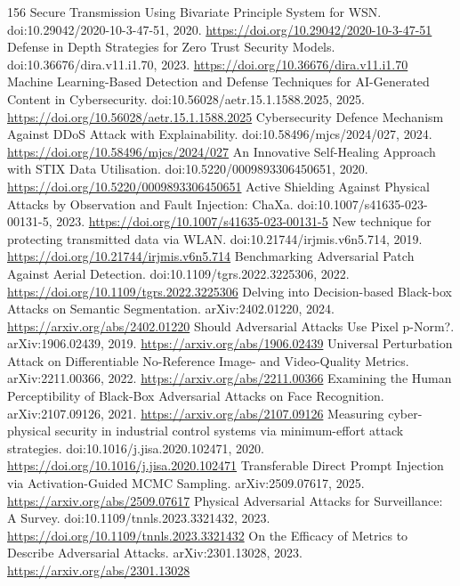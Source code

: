\documentclass[11pt]{article}
\begin{document}
\begin{thebibliography}{156}
 Secure Transmission Using Bivariate Principle System for WSN. doi:10.29042/2020-10-3-47-51, 2020. \url{https://doi.org/10.29042/2020-10-3-47-51}
 Defense in Depth Strategies for Zero Trust Security Models. doi:10.36676/dira.v11.i1.70, 2023. \url{https://doi.org/10.36676/dira.v11.i1.70}
 Machine Learning-Based Detection and Defense Techniques for AI-Generated Content in Cybersecurity. doi:10.56028/aetr.15.1.1588.2025, 2025. \url{https://doi.org/10.56028/aetr.15.1.1588.2025}
 Cybersecurity Defence Mechanism Against DDoS Attack with Explainability. doi:10.58496/mjcs/2024/027, 2024. \url{https://doi.org/10.58496/mjcs/2024/027}
 An Innovative Self-Healing Approach with STIX Data Utilisation. doi:10.5220/0009893306450651, 2020. \url{https://doi.org/10.5220/0009893306450651}
 Active Shielding Against Physical Attacks by Observation and Fault Injection: ChaXa. doi:10.1007/s41635-023-00131-5, 2023. \url{https://doi.org/10.1007/s41635-023-00131-5}
 New technique for protecting transmitted data via WLAN. doi:10.21744/irjmis.v6n5.714, 2019. \url{https://doi.org/10.21744/irjmis.v6n5.714}
 Benchmarking Adversarial Patch Against Aerial Detection. doi:10.1109/tgrs.2022.3225306, 2022. \url{https://doi.org/10.1109/tgrs.2022.3225306}
 Delving into Decision-based Black-box Attacks on Semantic Segmentation. arXiv:2402.01220, 2024. \url{https://arxiv.org/abs/2402.01220}
 Should Adversarial Attacks Use Pixel p-Norm?. arXiv:1906.02439, 2019. \url{https://arxiv.org/abs/1906.02439}
 Universal Perturbation Attack on Differentiable No-Reference Image- and Video-Quality Metrics. arXiv:2211.00366, 2022. \url{https://arxiv.org/abs/2211.00366}
 Examining the Human Perceptibility of Black-Box Adversarial Attacks on Face Recognition. arXiv:2107.09126, 2021. \url{https://arxiv.org/abs/2107.09126}
 Measuring cyber-physical security in industrial control systems via minimum-effort attack strategies. doi:10.1016/j.jisa.2020.102471, 2020. \url{https://doi.org/10.1016/j.jisa.2020.102471}
 Transferable Direct Prompt Injection via Activation-Guided MCMC Sampling. arXiv:2509.07617, 2025. \url{https://arxiv.org/abs/2509.07617}
 Physical Adversarial Attacks for Surveillance: A Survey. doi:10.1109/tnnls.2023.3321432, 2023. \url{https://doi.org/10.1109/tnnls.2023.3321432}
 On the Efficacy of Metrics to Describe Adversarial Attacks. arXiv:2301.13028, 2023. \url{https://arxiv.org/abs/2301.13028}

\end{thebibliography}
\end{document}
